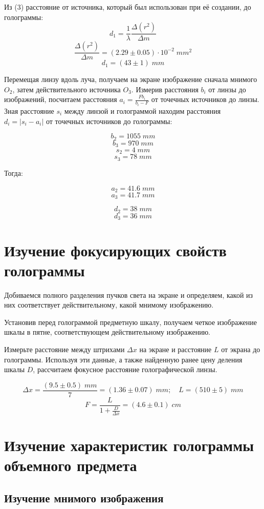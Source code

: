 \documentclass[a4paper, 12pt]{article}
\begin{document}
\noindent Из (3) расстояние от источника, который был использован при её создании, до голограммы: 
\[ d_1 = \frac{1}{\lambda}\frac{\Delta (r^2)}{\Delta m}\]
\[\frac{\Delta (r^2)}{\Delta m} = (2.29 \pm 0.05) \cdot 10^{-2}\; mm^2 \]
\[d_1 = (43 \pm 1) \;mm \]

\noindent Перемещая линзу вдоль луча, получаем на экране изображение сначала мнимого $O_2$, затем действительного источника $O_3$.
Измерив расстояния $b_i$ от линзы до изображений, посчитаем расстояния $a_i = \frac{Fb_i}{b_i - F}$ от точечных источников до линзы. Зная расстояние $s_i$ между линзой и голограммой находим расстояния $d_i = |s_i-a_i|$ от точечных источников до голограммы:

\[b_2 = 1055 \; mm\]
\[b_3 = 970 \;  mm\]
\[s_2 = 4 \; mm\]
\[s_3 = 78 \;  mm\]

\noindent Тогда:

\[a_2 = 41.6 \; mm\]
\[a_3 = 41.7 \;  mm\]

\[d_2 = 38 \; mm\]
\[d_3 = 36 \; mm\]

\newpage
\section{Изучение фокусирующих свойств голограммы}

\noindent Добиваемся полного разделения пучков света на экране и определяем, какой из них соответствует действительному, какой мнимому изображению. 

\noindent Установив перед голограммой предметную шкалу, получаем четкое изображение шкалы в пятне, соответствующем действительному изображению.

\noindent Измерьте расстояние между штрихами $ \Delta x $ на экране и расстояние $L$ от экрана до голограммы. Используя эти данные, а также найденную ранее цену деления шкалы $D$, рассчитаем фокусное расстояние голографической линзы.

\[ \Delta x = \frac{(9.5 \pm 0.5) \; mm}{7} = (1.36\pm 0.07) \; mm   ; \quad L = (510 \pm 5) \; mm \]
\[ F = \dfrac{L}{1+\frac{D}{\Delta x}} = (4.6 \pm 0.1) \; cm \]

\section{Изучение характеристик голограммы объемного предмета}
\subsection{Изучение мнимого изображения}
\end{document}
